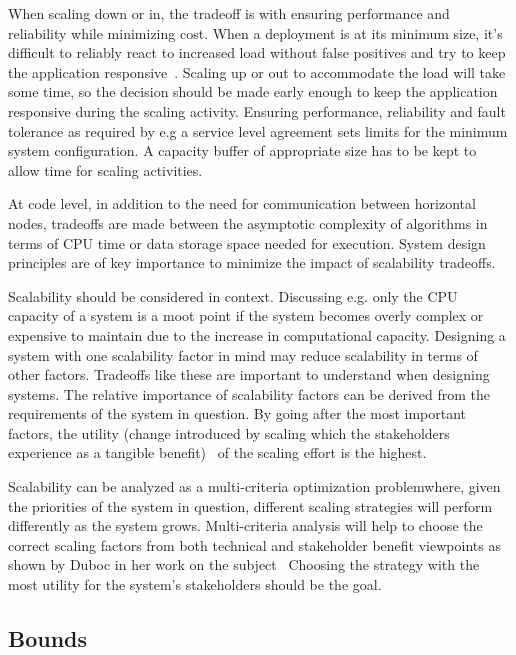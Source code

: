 \documentclass[english]{tktltiki2}
\theoremstyle{definition}
\theoremstyle{remark}
\begin{document}
When scaling down or in, the tradeoff is with ensuring performance and
reliability while minimizing cost. When a deployment is at its minimum size,
it’s difficult to reliably react to increased load without false positives and
try to keep the application responsive~. Scaling up or out to accommodate the load will take some
time, so the decision should be made early enough to keep the application
responsive during the scaling activity. Ensuring performance, reliability and
fault tolerance as required by e.g a service level agreement sets limits for the
minimum system configuration. A capacity buffer of appropriate size has to be
kept to allow time for scaling activities.

At code level, in addition to the need for communication between horizontal
nodes, tradeoffs are made between the asymptotic complexity of algorithms in
terms of CPU time or data storage space needed for execution. System design
principles are of key importance to minimize the impact of scalability
tradeoffs.

Scalability should be considered in context. Discussing e.g. only the CPU
capacity of a system is a moot point if the system becomes overly complex or
expensive to maintain due to the increase in computational capacity. Designing a
system with one scalability factor in mind may reduce scalability in terms of
other factors. Tradeoffs like these are important to understand when designing
systems. The relative importance of scalability factors can be derived from the
requirements of the system in question. By going after the most important
factors, the utility (change introduced by scaling which the stakeholders
experience as a tangible benefit)~\cite{DubocUtility} of the scaling effort is
the highest.

Scalability can be analyzed as a multi-criteria optimization problemwhere, given
the priorities of the system in question, different scaling strategies will
perform differently as the system grows. Multi-criteria analysis will help to
choose the correct scaling factors from both technical and stakeholder benefit
viewpoints as shown by Duboc in her work on the subject~\cite{Duboc2007}
Choosing the strategy with the most utility for the system’s stakeholders should
be the goal.

\subsection{Bounds}
\end{document}

